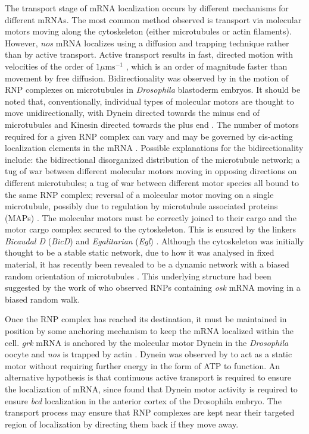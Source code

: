 \documentclass[twocolumn]{biophys}
\begin{document}
The transport stage of mRNA localization occurs by different mechanisms for different mRNAs.
The most common method observed is transport via molecular motors moving along the cytoskeleton (either microtubules or actin filaments). 
However, \textit{nos} mRNA localizes using a diffusion and trapping technique \citep{forrest2003live} rather than by active transport. 
Active transport results in fast, directed motion with velocities of the order of $1 \mu \text{m} \text{s}^{-1}$ \citep{weil2006localization, zimyanin2008vivo, DavidsonPhD2015}, which is an order of magnitude faster than movement by free diffusion.
Bidirectionality was observed by \citet{vendra2007dynactin} in the motion of RNP complexes on microtubules in \textit{Drosophila} blastoderm embryos.
It should be noted that, conventionally, individual types of molecular motors are thought to move unidirectionally, with Dynein directed towards the minus end of microtubules and Kinesin directed towards the plus end \citep{howard2001mechanics}.
The number of motors required for a given RNP complex can vary and may be governed by cis-acting localization elements in the mRNA \citep{amrute2012single}.
Possible explanations for the bidirectionality include: the bidirectional disorganized distribution of the microtubule network; a tug of war between different molecular motors moving in opposing directions on different microtubules; a tug of war between different motor species all bound to the same RNP complex; reversal of a molecular motor moving on a single microtubule, possibly due to regulation by microtubule associated proteins (MAPs) \citep{buxbaum2015right}. 
The molecular motors must be correctly joined to their cargo and the motor cargo complex secured to the cytoskeleton.
This is ensured by the linkers \textit{Bicaudal D} (\textit{BicD}) and \textit{Egalitarian} (\textit{Egl}) \citep{parton2014subcellular}. 
Although the cytoskeleton was initially thought to be a stable static network, due to how it was analysed in fixed material, it has recently been revealed to be a dynamic network with a biased random orientation of microtubules \citep{parton20111}.
This underlying structure had been suggested by the work of \citet{zimyanin2008vivo} who observed RNPs containing \textit{osk} mRNA moving in a biased random walk.  

Once the RNP complex has reached its destination, it must be maintained in position by some anchoring mechanism to keep the mRNA localized within the cell.
\textit{grk} mRNA is anchored by the molecular motor Dynein \citep{delanoue2005dynein} in the \textit{Drosophila} oocyte and \textit{nos} is trapped by actin \citep{forrest2003live}.
Dynein was observed by \citet{delanoue2005dynein} to act as a static motor without requiring further energy in the form of ATP to function. 
An alternative hypothesis is that continuous active transport is required to ensure the localization of mRNA, since \citet{weil2006localization} found that Dynein motor activity is required to ensure \textit{bcd} localization in the anterior cortex of the Drosophila embryo.
The transport process may ensure that RNP complexes are kept near their targeted region of localization by directing them back if they move away.
\end{document}
